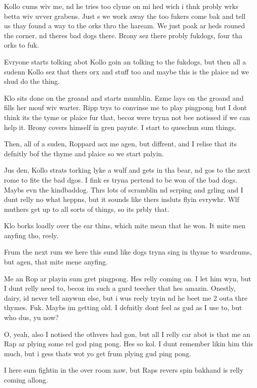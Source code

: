 Kollo cums wiv me, nd he tries too clyme on mi hed wich i thnk probly wrks betta wiv uvver grabens. Just s we work away the too fukers come bak and tell us thay found a way to the orks thro the haream. We just poak ar heds rouned the corner, nd theres bad dogs there. Brony sez there probly fukdogs, four tha orks to fuk.\medskip

Evryone starts tolking abot Kollo goin an tolking to the fukdogs, but then all a sudenn Kollo sez that thers orx and stuff too and maybe this is the plaice nd we shud do the thing.\medskip

Klo sits done on the groand and starts mumblin. Ezme lays on the groand and fills her mouf wiv warter. Ripp trys to convinse me to play pingpong but I dont think its the tyme or plaice fur that, becoz were tryna not bee notissed if we can help it. Brony covers himself in gren paynte. I start to queschun sum things.\medskip

Then, all of a suden, Roppard asx me agen, but diffrent, and I relise that its defnitly bof the thyme and plaice so we start palyin.\medskip

Jus den, Kollo strats torking lyke a wulf and gets in tha bear, nd gos to the next rome to fite the bad dgos. I fink es tryna pertend to be won of the bad dogs. Maybs evn the kindbaddog. Thrs lots of scramblin nd scrping and grling and I dunt relly no what heppns, but it sounds like thers insluts flyin evrywhr. Wlf muthers get up to all sorts of things, so its prbly that.\medskip

Klo borks loadly over the ear thins, which mite mean that he won. It mite men anyfing tho, reely.\medskip

Frum the next rum we here this sund like dogs tryna sing in thyme to wardrums, but agen, that mite mene anyfing.\medskip

Me an Rop ar playin sum gret pingpong. Hes relly coming on. I let him wyn, but I dunt relly need to, becoz im such a gurd teecher that hes amazin. Onestly, dairy, id never tell anywun else, but i wus reely tryin nd he beet me 2 outa thre thymes. Fuk. Maybs im getting old. I defnitly dont feel as gud as I use to, but who dus, yu now?\medskip

O, yeah, also I notised the othvers had gon, but all I relly car abot is that me an Rap ar plying some rel god ping pong. Hes so kol. I dunt remember likin him this much, but i gess thats wot yo get frum plying gud ping pong.\medskip

I here sum fightin in the over room naw, but Raps revers spin bakhand is relly coming allong.\medskip

